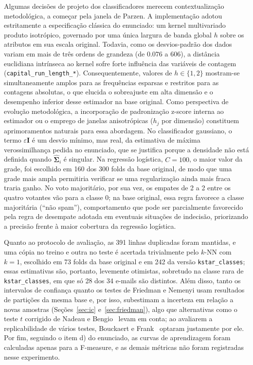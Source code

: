 \documentclass[11pt,a4paper]{article}
\begin{document}
Algumas decisões de projeto dos classificadores merecem contextualização metodológica, a começar pela janela de Parzen. A implementação adotou 
estritamente a especificação clássica do enunciado: um kernel multivariado produto isotrópico, governado por uma única largura de banda global $h$ 
sobre os atributos em sua escala original. Todavia, como os desvios-padrão dos dados variam em mais de três ordens de grandeza 
(de $\num{0.076}$ a $\num{606}$), a distância euclidiana intrínseca ao kernel sofre forte influência das variáveis de contagem 
(\texttt{capital\_run\_length\_*}). Consequentemente, valores de $h \in \{1, 2\}$ mostram-se simultaneamente amplos para as frequências esparsas e 
restritos para as contagens absolutas, o que elucida o sobreajuste em alta dimensão e o desempenho inferior desse estimador na base original. 
Como perspectiva de evolução metodológica, a incorporação de padronização z-score interna ao estimador ou o emprego de janelas anisotrópicas 
($h_j$ por dimensão) constituem aprimoramentos naturais para essa abordagem. No classificador gaussiano, o termo $\varepsilon\mathbf{I}$ é um desvio 
mínimo, mas real, da estimativa de máxima verossimilhança pedida no enunciado, que se justifica porque a densidade não está definida quando 
$\hat{\bm\Sigma}_i$ é singular. Na regressão logística, $C=100$, o maior valor da grade, foi escolhido em 160 dos 300 folds da base original, de modo 
que uma grade mais ampla permitiria verificar se uma regularização ainda mais fraca traria ganho. No voto majoritário, por sua vez, os empates de 2 a 2 
entre os quatro votantes vão para a classe 0; na base original, essa regra favorece a classe majoritária (\enquote{não spam}), comportamento que pode 
ser parcialmente favorecido pela regra de desempate adotada em eventuais situações de indecisão, priorizando a precisão frente à maior cobertura da 
regressão logística.

Quanto ao protocolo de avaliação, as 391 linhas duplicadas foram mantidas, e uma cópia no treino e outra no teste é acertada trivialmente pelo $k$-NN 
com $k=1$, escolhido em 73 folds da base original e em 242 da versão \texttt{kstar\_classes}; essas estimativas são, portanto, levemente otimistas, 
sobretudo na classe rara de \texttt{kstar\_classes}, em que só 28 dos 34 e-mails são distintos. Além disso, tanto os intervalos de confiança
quanto os testes de Friedman e Nemenyi usam resultados de partições da mesma base e, por isso, subestimam a incerteza em relação a novas amostras 
(Seções~\ref{sec:ic} e~\ref{sec:friedman}), algo que alternativas como o teste $t$ corrigido de Nadeau e Bengio~\cite{nadeau2003inference} levam
em conta; ao avaliarem a replicabilidade de vários testes, Bouckaert e Frank~\cite{bouckaert2004evaluating} optaram justamente por ele. 
Por fim, seguindo o item d) do enunciado, as curvas de aprendizagem foram calculadas apenas para a F-measure, e as demais métricas não 
foram registradas nesse experimento.
\end{document}

